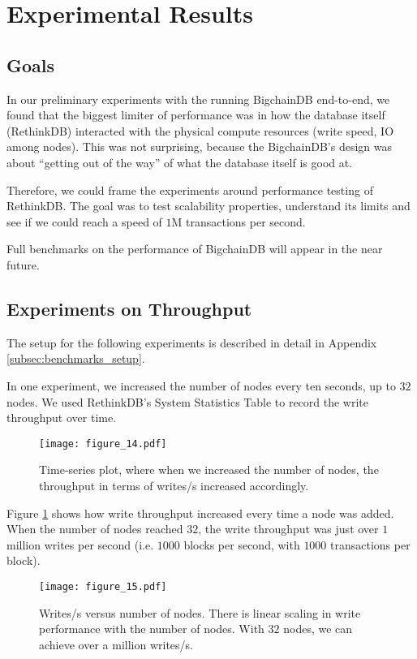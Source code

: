 \section{Experimental Results}\label{sec:benchmarks}

\subsection{Goals}

In our preliminary experiments with the running BigchainDB end-to-end, we found that the biggest limiter of performance was in how the database itself (RethinkDB) interacted with the physical compute resources (write speed, IO among nodes).
This was not surprising, because the BigchainDB’s design was about “getting out of the way” of what the database itself is good at.

Therefore, we could frame the experiments around performance testing of RethinkDB.
The goal was to test scalability properties, understand its limits and see if we could reach a speed of $1$M transactions per second.

Full benchmarks on the performance of BigchainDB will appear in the near future.

\subsection{Experiments on Throughput}

The setup for the following experiments is described in detail in Appendix \ref{subsec:benchmarks_setup}.

In one experiment, we increased the number of nodes every ten seconds, up to $32$ nodes.
We used RethinkDB's System Statistics Table to record the write throughput over time.

\begin{figure}[!ht]
  \centering
  \texttt{[image: figure\_14.pdf]}
  \caption{Time-series plot, where when we increased the number of nodes, the throughput in terms of writes/s increased accordingly.}
  \label{fig:bigchain_throughput_vs_nodes}
\end{figure}

Figure \ref{fig:bigchain_throughput_vs_nodes} shows how write throughput increased every time a node was added.
When the number of nodes reached $32$, the write throughput was just over $1$ million writes per second (i.e. $1000$ blocks per second, with $1000$ transactions per block).

\begin{figure}[!ht]
  \centering
  \texttt{[image: figure\_15.pdf]}
  \caption{Writes/s versus number of nodes. There is linear scaling in write performance with the number of nodes. With $32$ nodes, we can achieve over a million writes/s.}
  \label{fig:bigchain_writes_vs_nodes}
\end{figure}

